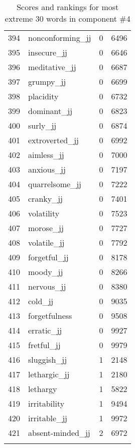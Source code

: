 \begin{longtable}[!htbp]{| rlr@{.}l |}
    394 & nonconforming\_jj & 0 & 6496 \\
    395 & insecure\_jj & 0 & 6646 \\
    396 & meditative\_jj & 0 & 6687 \\
    397 & grumpy\_jj & 0 & 6699 \\
    398 & placidity & 0 & 6732 \\
    399 & dominant\_jj & 0 & 6823 \\
    400 & surly\_jj & 0 & 6874 \\
    401 & extroverted\_jj & 0 & 6992 \\
    402 & aimless\_jj & 0 & 7000 \\
    403 & anxious\_jj & 0 & 7197 \\
    404 & quarrelsome\_jj & 0 & 7222 \\
    405 & cranky\_jj & 0 & 7401 \\
    406 & volatility & 0 & 7523 \\
    407 & morose\_jj & 0 & 7727 \\
    408 & volatile\_jj & 0 & 7792 \\
    409 & forgetful\_jj & 0 & 8178 \\
    410 & moody\_jj & 0 & 8266 \\
    411 & nervous\_jj & 0 & 8380 \\
    412 & cold\_jj & 0 & 9035 \\
    413 & forgetfulness & 0 & 9508 \\
    414 & erratic\_jj & 0 & 9927 \\
    415 & fretful\_jj & 0 & 9979 \\
    416 & sluggish\_jj & 1 & 2148 \\
    417 & lethargic\_jj & 1 & 2180 \\
    418 & lethargy & 1 & 5822 \\
    419 & irritability & 1 & 9494 \\
    420 & irritable\_jj & 1 & 9972 \\
    421 & absent-minded\_jj & 2 & 6972 \\
    \hline
    \caption{Scores and rankings for most extreme 30 words in component \#4} \\
\end{longtable}
